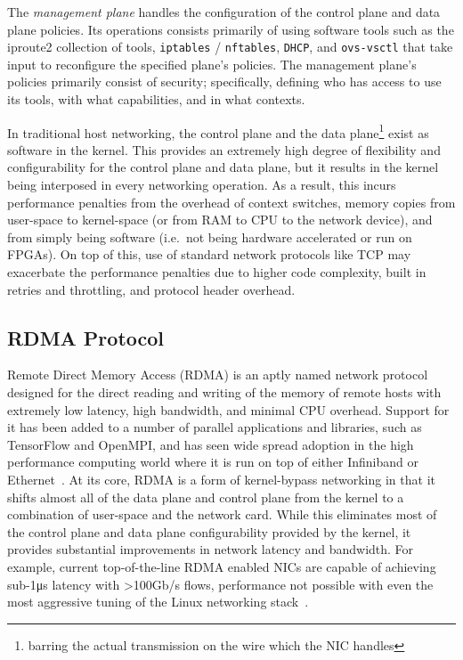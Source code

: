 \documentclass[12pt,titlepage]{article}
\begin{document}
The \textit{management plane} handles the configuration of the control plane and data plane policies.
Its operations consists primarily of using software tools such as the iproute2 collection of tools, \texttt{iptables} / \texttt{nftables}, \texttt{DHCP}, and \texttt{ovs-vsctl} that take input to reconfigure the specified plane's policies.
The management plane's policies primarily consist of security; specifically, defining who has access to use its tools, with what capabilities, and in what contexts.

In traditional host networking, the control plane and the data plane\footnote{barring the actual transmission on the wire which the NIC handles} exist as software in the kernel.
This provides an extremely high degree of flexibility and configurability for the control plane and data plane, but it results in the kernel being interposed in every networking operation.
As a result, this incurs performance penalties from the overhead of context switches, memory copies from user-space to kernel-space (or from RAM to CPU to the network device), and from simply being software (i.e.\ not being hardware accelerated or run on FPGAs).
On top of this, use of standard network protocols like TCP may exacerbate the performance penalties due to higher code complexity, built in retries and throttling, and protocol header overhead.

\subsection{RDMA Protocol}\label{subsec:RDMA Protocol}
Remote Direct Memory Access (RDMA) is an aptly named network protocol designed for the direct reading and writing of the memory of remote hosts with extremely low latency, high bandwidth, and minimal CPU overhead.
Support for it has been added to a number of parallel applications and libraries, such as TensorFlow and OpenMPI, and has seen wide spread adoption in the high performance computing world where it is run on top of either Infiniband or Ethernet~\cite{kim2019freeflow}.
At its core, RDMA is a form of kernel-bypass networking in that it shifts almost all of the data plane and control plane from the kernel to a combination of user-space and the network card.
While this eliminates most of the control plane and data plane configurability provided by the kernel, it provides substantial improvements in network latency and bandwidth.
For example, current top-of-the-line RDMA enabled NICs are capable of achieving sub-1\si{\micro\second} latency with >100Gb/s flows, performance not possible with even the most aggressive tuning of the Linux networking stack~\cite{mellanoxcx6doc,cloudflarelowlatency,intel800nic}.
\end{document}
